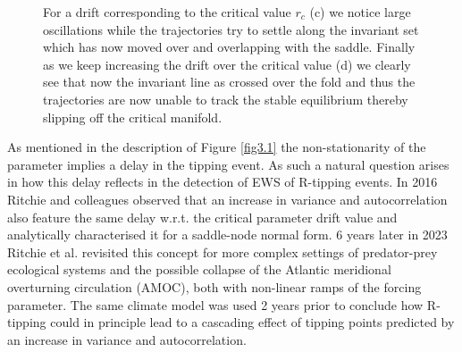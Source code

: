 \documentclass[../main.tex]{subfiles}
\begin{document}
\begin{example_continued}
\begin{figure}[H]
{    For a drift corresponding to the critical value $r_{c}$ (c) we notice large oscillations while the trajectories try to settle along the invariant set which has now moved over and overlapping with the saddle.
Finally as we keep increasing the drift over the critical value (d) we clearly see that now the invariant line as crossed over the fold and thus the trajectories are now unable to track the stable equilibrium thereby slipping off the critical manifold.}
    \label{fig3.2}
\end{figure} 
\end{example_continued}
As mentioned in the description of Figure \ref{fig3.1} the non-stationarity of the parameter implies a delay in the tipping event. 
As such a natural question arises in how this delay reflects in the detection of EWS of R-tipping events. 
In 2016 Ritchie and colleagues \cite{Ritchie16} observed that an increase in variance and autocorrelation also feature the same delay w.r.t. the critical parameter drift value and analytically characterised it for a saddle-node normal form.
6 years later in 2023 Ritchie et al. \cite{Ritchie23} revisited this concept for more complex settings of predator-prey ecological systems and the possible collapse of the Atlantic meridional overturning circulation (AMOC), both with non-linear ramps of the forcing parameter.
The same climate model was used 2 years prior \cite{Lohmann21} to conclude how R-tipping could in principle lead to a cascading effect of tipping points predicted by an increase in variance and autocorrelation.
\end{document}
